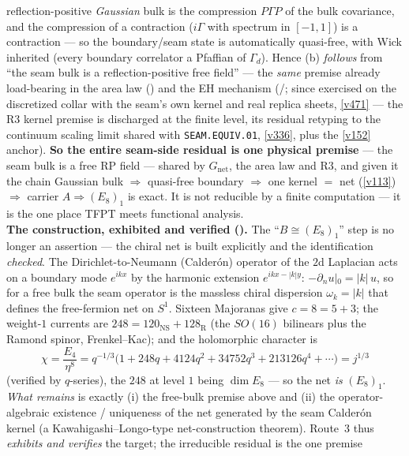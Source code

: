 \documentclass[11pt,a4paper]{article}
\begin{document}
\begin{keybox}
reflection-positive \emph{Gaussian} bulk is the compression $P\Gamma P$ of the bulk covariance, and the
compression of a contraction ($i\Gamma$ with spectrum in $[-1,1]$) is a contraction --- so the boundary/seam
state is automatically quasi-free, with Wick inherited (every boundary correlator a Pfaffian of $\Gamma_d$).
Hence (b) \emph{follows} from ``the seam bulk is a reflection-positive free field'' --- the \emph{same}
premise already load-bearing in the area law () and the EH mechanism
(/; since exercised on the discretized collar
with the seam's own kernel and real replica sheets, \vref{v471} --- the R3 kernel premise is discharged at
the finite level, its residual retyping to the continuum scaling limit shared with \texttt{SEAM.EQUIV.01},
\vref{v336}, plus the \vref{v152} anchor). \textbf{So the entire seam-side residual is one
physical premise} --- the seam bulk is a free RP field --- shared by $G_{\mathrm{net}}$, the area law and R3,
and given it the chain Gaussian bulk $\Rightarrow$ quasi-free boundary $\Rightarrow$ one kernel $=$ net
(\vref{v113}) $\Rightarrow$ carrier $A\Rightarrow(E_8)_1$ is exact. It is not reducible by a finite computation
--- it is the one place TFPT meets functional analysis.
\smallskip\\
\noindent\textbf{The construction, exhibited and verified ().} The
``$B\cong(E_8)_1$'' step is no longer an assertion --- the chiral net is built explicitly and the
identification \emph{checked}. The Dirichlet-to-Neumann (Calder\'on) operator of the $2$d Laplacian acts
on a boundary mode $e^{ikx}$ by the harmonic extension $e^{ikx-|k|y}$: $-\partial_n u|_0=|k|\,u$, so for a
free bulk the seam operator is the massless chiral dispersion $\omega_k=|k|$ that defines the free-fermion
net on $S^1$. Sixteen Majoranas give $c=8=5{+}3$; the weight-$1$ currents are
$248=120_{\mathrm{NS}}+128_{\mathrm R}$ (the $SO(16)$ bilinears plus the Ramond spinor, Frenkel--Kac); and
the holomorphic character is
\[
  \boxed{\ \chi=\frac{E_4}{\eta^8}=q^{-1/3}\bigl(1+248q+4124q^2+34752q^3+213126q^4+\cdots\bigr)=j^{1/3}\ }
\]
(verified by $q$-series), the $248$ at level $1$ being $\dim E_8$ --- so the net \emph{is} $(E_8)_1$.
\emph{What remains} is exactly (i) the free-bulk premise above and (ii) the operator-algebraic existence /
uniqueness of the net generated by the seam Calder\'on kernel (a Kawahigashi--Longo-type net-construction
theorem). Route~3 thus \emph{exhibits and verifies} the target; the irreducible residual is the one premise

\end{keybox}
\end{document}
